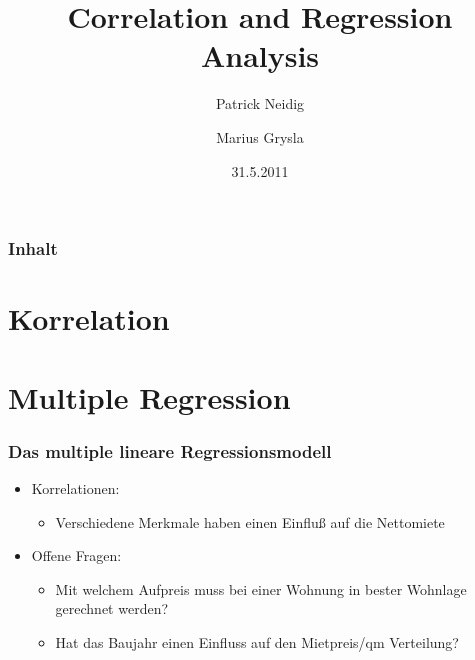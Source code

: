 \documentclass{beamer}
\begin{document}
\title{Correlation and Regression Analysis}
\author{Patrick Neidig \and Marius Grysla}
\date{31.5.2011}
\frame{\titlepage}

\begin{frame}
 \frametitle{Inhalt}
 \tableofcontents
\end{frame}

\section{Korrelation}
\begin{frame}
 
\end{frame}


\section{Multiple Regression}
\begin{frame}
 \frametitle{Das multiple lineare Regressionsmodell}
 \begin{itemize}
 \item Korrelationen:
   \begin{itemize}
   \item Verschiedene Merkmale haben einen Einfluß auf die Nettomiete
   \end{itemize}
 \item Offene Fragen:
   \begin{itemize}
   \item Mit welchem Aufpreis muss bei einer Wohnung in bester Wohnlage gerechnet werden?
   \item Hat das Baujahr einen Einfluss auf den Mietpreis/qm Verteilung?
   \end{itemize}
 \end{itemize}

 
\end{frame}
\end{document}
